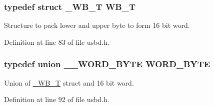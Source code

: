 \subsubsection[{\texorpdfstring{W\+B\+\_\+T}{WB_T}}]{\setlength{\rightskip}{0pt plus 5cm}typedef struct {\bf \+\_\+\+W\+B\+\_\+T} {\bf W\+B\+\_\+T}}\hypertarget{group__USBD__Core_ga4fbe30f5ac133f5bb15c653a19162ae9}{}\label{group__USBD__Core_ga4fbe30f5ac133f5bb15c653a19162ae9}
Structure to pack lower and upper byte to form 16 bit word. 

Definition at line 83 of file usbd.\+h.

\subsubsection[{\texorpdfstring{W\+O\+R\+D\+\_\+\+B\+Y\+TE}{WORD_BYTE}}]{\setlength{\rightskip}{0pt plus 5cm}typedef union {\bf \+\_\+\+\_\+\+W\+O\+R\+D\+\_\+\+B\+Y\+TE} {\bf W\+O\+R\+D\+\_\+\+B\+Y\+TE}}\hypertarget{group__USBD__Core_ga340ec8de2973608b96d5cc7379b9561a}{}\label{group__USBD__Core_ga340ec8de2973608b96d5cc7379b9561a}
Union of \hyperlink{struct__WB__T}{\+\_\+\+W\+B\+\_\+T} struct and 16 bit word. 

Definition at line 92 of file usbd.\+h.

